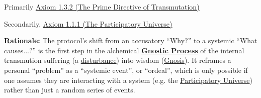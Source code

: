 \documentclass{article}
\begin{document}
\begin{nobullet}
\begin{nobullet}
                \item Primarily \hyperref[axiom_1_3_2_the_prime_directive_of_transmutation]{Axiom 1.3.2 (The Prime Directive of Transmutation)}
                \item Secondarily, \hyperref[axiom_1_1_1_the_participatory_universe]{Axiom 1.1.1 (The Participatory Universe)}
            \end{nobullet}
        \begin{nobullet}
            \item \textbf{Rationale:} The protocol's shift from an accusatory ``Why?'' to a systemic ``What causes...?'' is the first step in the alchemical \textbf{\hyperlink{gloss:gnostic_process}{Gnostic Process}} of the internal transmution suffering (a \hyperlink{gloss:disturbance}{disturbance}) into wisdom (\hyperlink{gloss:gnosis}{Gnosis}). It reframes a personal ``problem'' as a ``systemic event'', or ``ordeal'', which is only possible if one assumes they are interacting with a system (e.g. the \hyperlink{gloss:participatory_universe}{Participatory Universe}) rather than just a random series of events.
        \end{nobullet}
\end{nobullet}
\end{document}
